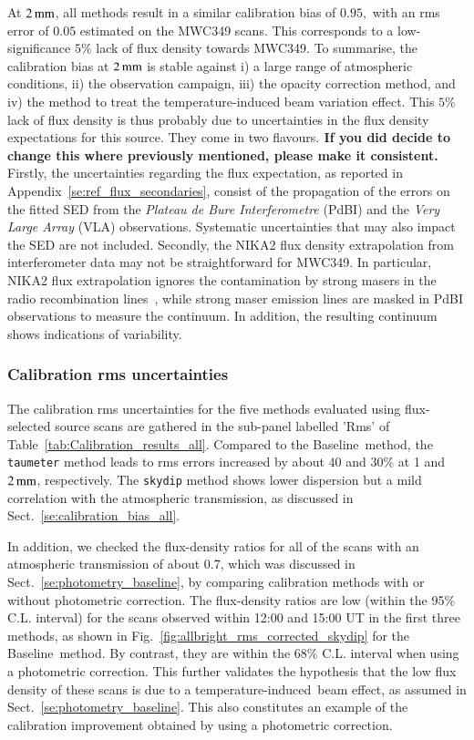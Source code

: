 \documentclass[traditionalabstract]{aa}
\newcommand{\afternoon}{temperature-induced}
\newcommand{\baseline}{Baseline}%
\newcommand{\lp}[1]{#1}
\newcommand{\LEt}[1]{{\bf {\color[RGB]{0, 153, 255} #1}}}
\begin{document}
{At $2\,\rm{mm}$, all methods result in a similar calibration bias
of $0.95,$ with an rms error of $0.05$ estimated on the MWC349 scans. 
This corresponds to a low-significance $5\%$ lack of flux density
towards MWC349.
To summarise, the calibration bias at $2\, \rm{mm}$ is stable against
i) a large range of atmospheric conditions, ii) the observation campaign, iii) the
opacity correction method, and iv) the method to treat the
temperature-induced beam variation effect.
This $5\%$ lack of flux density is thus probably due to
uncertainties in the flux density expectations for this source.
They come in two flavours.\LEt{If you did decide to change this where previously mentioned, please make it consistent.}
{\lp Firstly, the uncertainties regarding the flux expectation, as reported in
Appendix~\ref{se:ref_flux_secondaries}, consist of the propagation of
the errors on the fitted SED from the \emph{Plateau de Bure Interferometre}
(PdBI) and the \emph{Very Large Array} (VLA) observations. Systematic
uncertainties that may also impact the SED are not included.}  
Secondly, the NIKA2 flux density extrapolation from
interferometer data may not be straightforward for MWC349. {\lp In
particular, NIKA2 flux extrapolation ignores the contamination by
strong masers in the radio recombination lines~\citep{masingRRL},
while strong maser emission lines are masked in PdBI observations to
measure the continuum. In addition, the resulting continuum shows
indications of variability.}


\subsubsection{Calibration rms uncertainties}

The calibration rms uncertainties for the five methods evaluated using
flux-selected source scans are gathered in the sub-panel labelled 'Rms'
of Table~\ref{tab:Calibration_results_all}.
Compared to the \baseline\ method, the {\tt taumeter} method leads to 
rms errors increased by about $40$ and $30\%$ at 1 and
$2\,\rm{mm}$, respectively. The {\tt skydip} method shows lower
dispersion but a mild correlation with the atmospheric transmission, as
discussed in Sect.~\ref{se:calibration_bias_all}.

In addition, we checked the flux-density ratios for all of the
scans with an atmospheric transmission of about 0.7, which was
discussed in Sect.~\ref{se:photometry_baseline}, by comparing
calibration methods with or without photometric correction. The
flux-density ratios are low (within the 95\% C.L. interval) for the scans
observed within 12:00 and 15:00 UT in the first three methods, as shown in
Fig.~\ref{fig:allbright_rms_corrected_skydip} for
the \baseline\ method. By contrast, they are within the 68\% C.L. interval
when using a photometric correction. This further validates the
hypothesis that the low flux
density of these scans is due to a \afternoon\ beam effect, as assumed in
Sect.~\ref{se:photometry_baseline}. This also constitutes an example
of the calibration improvement obtained by using a
photometric correction.

}
\end{document}
